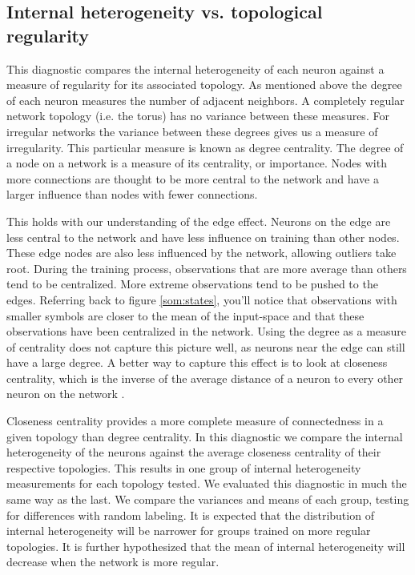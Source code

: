 \subsection{Internal heterogeneity vs. topological regularity}
This diagnostic compares the internal heterogeneity of each neuron against a
measure of regularity for its associated topology.  As mentioned above the
degree of each neuron measures the number of adjacent neighbors.  A completely
regular network topology (i.e. the torus) has no variance between these
measures.  For irregular networks the variance between these degrees gives us
a measure of irregularity. This particular measure is known as degree
centrality.  The degree of a node on a network is a measure of its centrality, or
importance. Nodes with more connections are thought to be more central to the
network and have a larger influence than nodes with fewer connections.

This holds with our understanding of the edge effect.  Neurons on the edge are
less central to the network and have less influence on training than other nodes.  These
edge nodes are also less influenced by the network, allowing outliers take
root.  During the training process, observations that are more average than
others tend to be centralized.  More extreme observations tend to be pushed to
the edges.  Referring back to figure \ref{som:states}, you'll notice
that observations with smaller symbols are closer to the mean of the
input-space and that these observations have been centralized in the network.
Using the degree as a measure of centrality does not capture this picture
well, as neurons near the edge can still have a large degree.  A better way to
capture this effect is to look at closeness centrality, which is the
inverse of the average distance of a neuron to every other neuron on the
network \citep{Wasserman:1994}.

Closeness centrality provides a more complete measure of connectedness in a
given topology than degree centrality.  In this diagnostic we compare the
internal heterogeneity of the neurons against the average closeness centrality
of their respective topologies.  This results in one group of internal
heterogeneity measurements for each topology tested.  We evaluated this
diagnostic in much the same way as the last.  We compare the variances and
means of each group, testing for differences with random labeling.  It is
expected that the distribution of internal heterogeneity will be narrower for
groups trained on more regular topologies.  It is further hypothesized that
the mean of internal heterogeneity will decrease when the network is more
regular.  %

